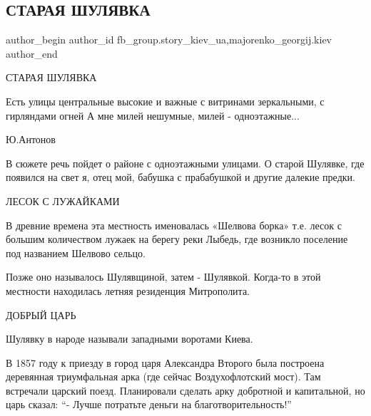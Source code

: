  
 
 
 
 
 
\subsection{СТАРАЯ ШУЛЯВКА}
\label{sec:26_12_2021.fb.fb_group.story_kiev_ua.5.staraja_shuljavka}
 
\ifcmt
 author_begin
   author_id fb_group.story_kiev_ua,majorenko_georgij.kiev
 author_end
\fi

СТАРАЯ ШУЛЯВКА

\obeycr
Есть улицы центральные
высокие и важные
с витринами зеркальными,
с гирляндами огней
А мне милей нешумные,
милей - одноэтажные...
\restorecr

Ю.Антонов

В сюжете речь пойдет о районе с одноэтажными улицами. О старой Шулявке, где
появился на свет я, отец мой, бабушка с прабабушкой и другие далекие предки. 

\raggedcolumns
\begin{multicols}{3} %
\setlength{\parindent}{0pt}

\end{multicols} %

ЛЕСОК С ЛУЖАЙКАМИ

В древние времена эта местность именовалась «Шелвова борка» т.е. лесок с
большим количеством лужаек на берегу реки Лыбедь, где возникло поселение под
названием Шелвово сельцо.

Позже оно называлось Шулявщиной, затем - Шулявкой. Когда-то в этой местности
находилась летняя резиденция Митрополита.

ДОБРЫЙ ЦАРЬ

Шулявку в народе называли западными воротами Киева. 

В 1857 году к приезду в город царя Александра Второго была построена деревянная
триумфальная арка (где сейчас Воздухофлотский мост). Там встречали царский
поезд. Планировали сделать арку добротной и капитальной, но царь сказал:
\enquote{- Лучше потратьте деньги на благотворительность!}

